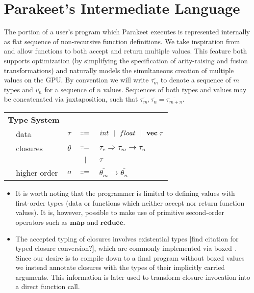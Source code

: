\documentclass[preprint]{sigplanconf}
\begin{document}
\section{Parakeet's Intermediate Language}
The portion of a user's program which Parakeet executes is represented internally as flat sequence of non-recursive function definitions. 
We take inspiration from \cite{Bol09} and allow functions to both accept and return multiple values. This feature both supports optimization (by simplifying the specification of arity-raising and fusion transformations) and naturally models the simultaneous creation of multiple values on the GPU. By convention we will write $\overline{\tau_m}$ to denote a sequence of $m$ types and $\overline{v_n}$ for a sequence  of $n$ values. Sequences of both types and values may be concatenated via juxtaposition, such that $\overline{\tau_m}, \overline{\tau_n} = \overline{\tau_{m+n}}$. 
\\[5pt]
\begin{tabular}{m{0.005cm}m{1.8cm}m{0.05cm}m{0.2cm}p{4.8cm}}
\multicolumn{2}{l}{\textbf{Type System}} & & &  \\
& data     & $\tau$    & $::=$ & $int \ \ | \ \  float \ \ | \ \  \mathbf{vec} \; \tau   $ \\[4pt]
& closures        & $\theta$  & $::=$ & $\overline{\tau_{c}} \Rightarrow \overline{\tau_m} \rightarrow \overline{\tau_n}$\\[2pt]
&                 &           & $\ \ | \ \ $    & $\tau$ \\[4pt]
& higher-order    & $\sigma$  & $::=$ & $\overline{\theta_m} \rightarrow \overline{\theta_n} $ \\[4pt]
\end{tabular}
\begin{itemize}
\item It is worth noting that the programmer is limited to defining values with first-order types (data or functions which neither accept nor return function values). It is, however, possible to make use of primitive second-order operators such as $\mathbf{map}$ and $\mathbf{reduce}$. 
\item The accepted typing of closures involves existential types [find citation for typed closure conversion?], which are commonly implemented via boxed . Since our desire is to compile down to a final program without boxed values we instead annotate closures with the types of their implicitly carried arguments. This information is later used to transform closure invocation into a direct function call. 
\end{itemize}
\end{document}
